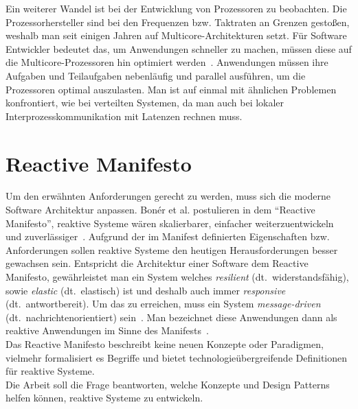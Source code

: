 Ein weiterer Wandel ist bei der Entwicklung von Prozessoren zu beobachten. Die Prozessorhersteller sind bei den Frequenzen bzw. Taktraten an Grenzen gestoßen, weshalb man seit einigen Jahren auf Multicore-Architekturen setzt. Für Software Entwickler bedeutet das, um Anwendungen schneller zu machen, müssen diese auf die Multicore-Prozessoren hin optimiert werden~\cite[S. 15]{butcher_seven_2014}. Anwendungen müssen ihre Aufgaben und Teilaufgaben nebenläufig und parallel ausführen, um die Prozessoren optimal auszulasten. Man ist auf einmal mit ähnlichen Problemen konfrontiert, wie bei verteilten Systemen, da man auch bei lokaler Interprozesskommunikation mit Latenzen rechnen muss.

\pagebreak

\section{Reactive Manifesto}
Um den erwähnten Anforderungen gerecht zu werden, muss sich die moderne Software Architektur anpassen. Bonér et al. postulieren in dem \enquote{Reactive Manifesto}, reaktive Systeme wären skalierbarer, einfacher weiterzuentwickeln und zuverlässiger~\cite{boner_reactive_2014}. Aufgrund der im Manifest definierten Eigenschaften bzw. Anforderungen sollen reaktive Systeme den heutigen Herausforderungen besser gewachsen sein. Entspricht die Architektur einer Software dem Reactive Manifesto, gewährleistet man ein System welches \textit{resilient} (dt.~widerstandsfähig), sowie \textit{elastic} (dt.~elastisch) ist und deshalb auch immer \textit{responsive} (dt.~antwortbereit). Um das zu erreichen, muss ein System \textit{message-driven} (dt.~nachrichtenorientiert) sein~\cite[S.~5]{vernon_reactive_2016}. Man bezeichnet diese Anwendungen dann als reaktive Anwendungen im Sinne des Manifests~\cite{boner_reactive_2014}.\\
Das Reactive Manifesto beschreibt keine neuen Konzepte oder Paradigmen, vielmehr formalisiert es Begriffe und bietet technologieübergreifende Definitionen für reaktive Systeme.\\

Die Arbeit soll die Frage beantworten, welche Konzepte und Design Patterns helfen können, reaktive Systeme zu entwickeln.
